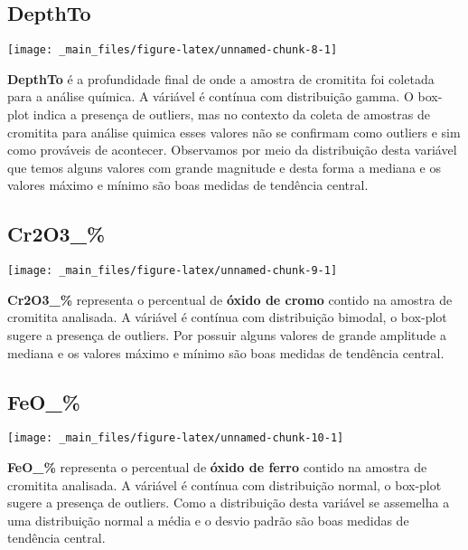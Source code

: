 \documentclass[
]{article}
\begin{document}
\hypertarget{depthto}{%
\subsection{DepthTo}\label{depthto}}

\begin{center}\texttt{[image: \_main\_files/figure-latex/unnamed-chunk-8-1]} \end{center}

\textbf{DepthTo} é a profundidade final de onde a amostra de cromitita foi coletada para a análise química. A váriável é contínua com distribuição gamma. O box-plot indica a presença de outliers, mas no contexto da coleta de amostras de cromitita para análise quimica esses valores não se confirmam como outliers e sim como prováveis de acontecer. Observamos por meio da distribuição desta variável que temos alguns valores com grande magnitude e desta forma a mediana e os valores máximo e mínimo são boas medidas de tendência central.

\hypertarget{cr2o3_}{%
\subsection{Cr2O3\_\%}\label{cr2o3_}}

\begin{center}\texttt{[image: \_main\_files/figure-latex/unnamed-chunk-9-1]} \end{center}

\textbf{Cr2O3\_\%} representa o percentual de \textbf{óxido de cromo} contido na amostra de cromitita analisada. A váriável é contínua com distribuição bimodal, o box-plot sugere a presença de outliers. Por possuir alguns valores de grande amplitude a mediana e os valores máximo e mínimo são boas medidas de tendência central.

\hypertarget{feo_}{%
\subsection{FeO\_\%}\label{feo_}}

\begin{center}\texttt{[image: \_main\_files/figure-latex/unnamed-chunk-10-1]} \end{center}

\textbf{FeO\_\%} representa o percentual de \textbf{óxido de ferro} contido na amostra de cromitita analisada. A váriável é contínua com distribuição normal, o box-plot sugere a presença de outliers. Como a distribuição desta variável se assemelha a uma distribuição normal a média e o desvio padrão são boas medidas de tendência central.
\end{document}
